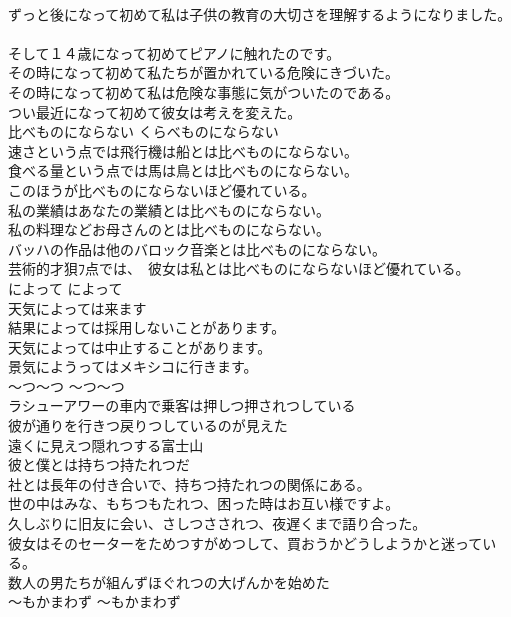 \documentclass[8pt]{extreport}
\begin{document}
\begin{CJK}{UTF8}{min}
\\	ずっと後になって初めて私は子供の教育の大切さを理解するようになりました。   
\\	そして１４歳になって初めてピアノに触れたのです。   
\\	その時になって初めて私たちが置かれている危険にきづいた。  
\\	その時になって初めて私は危険な事態に気がついたのである。   
\\	つい最近になって初めて彼女は考えを変えた。   
\\	比べものにならない	くらべものにならない	
\\	速さという点では飛行機は船とは比べものにならない。  
\\	食べる量という点では馬は鳥とは比べものにならない。  
\\	このほうが比べものにならないほど優れている。   
\\	私の業績はあなたの業績とは比べものにならない。   
\\	私の料理などお母さんのとは比べものにならない。   
\\	バッハの作品は他のバロック音楽とは比べものにならない。   
\\	芸術的才狽ﾌ点では、　彼女は私とは比べものにならないほど優れている。  
\\	によって	によって	
\\	天気によっては来ます  
\\	結果によっては採用しないことがあります。  
\\	天気によっては中止することがあります。  
\\	景気にようってはメキシコに行きます。  
\\	〜つ〜つ	〜つ〜つ	
\\	ラシューアワーの車内で乗客は押しつ押されつしている  
\\	彼が通りを行きつ戻りつしているのが見えた  
\\	遠くに見えつ隠れつする富士山  
\\	彼と僕とは持ちつ持たれつだ  
\\	社とは長年の付き合いで、持ちつ持たれつの関係にある。  
\\	世の中はみな、もちつもたれつ、困った時はお互い様ですよ。  
\\	久しぶりに旧友に会い、さしつさされつ、夜遅くまで語り合った。  
\\	彼女はそのセーターをためつすがめつして、買おうかどうしようかと迷っている。  
\\	数人の男たちが組んずほぐれつの大げんかを始めた  
\\	〜もかまわず	〜もかまわず	

\end{CJK}
\end{document}
